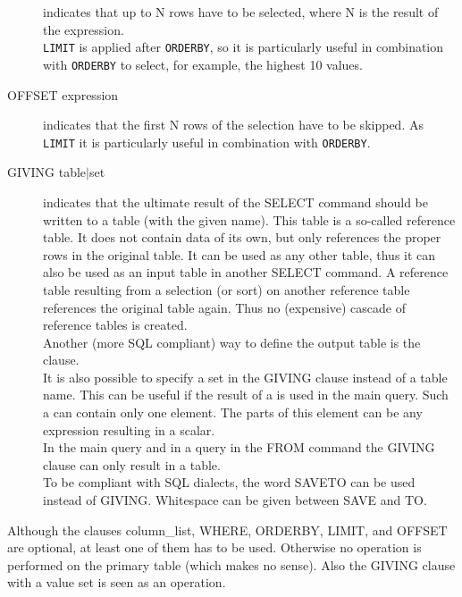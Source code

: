 \begin{description}
       indicates that up to N rows have to be selected, where N is
       the result of the expression. 
       \\\texttt{LIMIT} is applied after \texttt{ORDERBY}, so it is
       particularly useful in combination with
       \texttt{ORDERBY} to select, for example, the highest 10 values.
  \item[ OFFSET expression]
       indicates that the first N rows of the selection have to be 
       skipped. As \texttt{LIMIT} it is particularly useful in
       combination with \texttt{ORDERBY}.
  \item[ \label{TAQL:GIVING}GIVING table$|$set ]
       indicates that the ultimate result of the SELECT command should be
       written to a table (with the given name). This table is a
       so-called reference table.
       It does not contain data of its own, but only references the
       proper rows in the original table. It can be used
       as any other table, thus it can also be used as an input table in
       another SELECT command. A reference table resulting from
       a selection (or sort) on another reference table references the
       original table again. Thus no (expensive) cascade of reference
       tables is created.
       \\Another (more SQL compliant) way to define the output table
       is the  clause.
       \\It is also possible to specify a set in the GIVING clause
       instead of a table name. This can be useful if the result of a
        is used in the main query.
       Such a  can contain only one element.
       The parts of this element can be any expression resulting in a scalar.
       \\In the main query and in a query in the FROM command the
       GIVING clause can only result in a table.
       \\To be compliant with SQL dialects, the word SAVETO can be
       used instead of GIVING. Whitespace can be given between SAVE and TO.
 
\end{description}
Although the clauses column\_list, WHERE, ORDERBY, LIMIT, and OFFSET
are optional,
at least one of them has to be used. Otherwise no operation is
performed on the primary table (which makes no sense).
Also the GIVING clause with a value set is seen as an operation.


